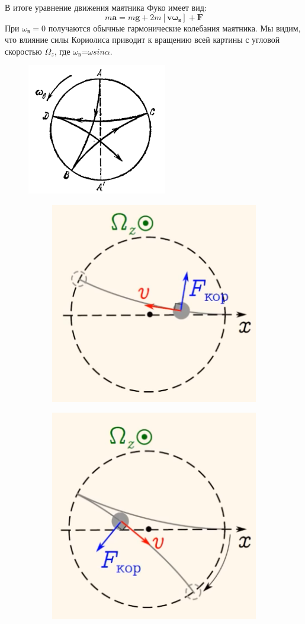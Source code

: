 \documentclass[a4, 12pt]{article}
\begin{document}
В итоге уравнение движения маятника Фуко имеет вид:
\begin{equation*}
    m\mathbf{a}=m\mathbf{g}+2m[\mathbf{v}\boldsymbol{\omega_\textbf{в}}]+\mathbf{F}
\end{equation*}
При $\omega_\textbf{в}=0$ получаются обычные гармонические колебания маятника. Мы видим, что влияние силы Кориолиса приводит к вращению всей картины с угловой скоростью $\Omega_z$, где $\omega_\textbf{в}$=$\omega sin\alpha$.\\
\begin{figure}[H]
    \centering
    \includegraphics[scale = 0.7]{traek1.png}
    \caption{}
\end{figure}
\newpage
\begin{figure}
\centering
\begin{subfigure}{\textwidth}
  \centering
  \includegraphics[width=.4\linewidth]{1f.png}
  \label{fig:sub1}
\end{subfigure}%
\begin{subfigure}{\textwidth}
  \centering
  \includegraphics[width=.4\linewidth]{2f.png}
  \label{fig:sub2}
\end{subfigure}
\label{fig:test}
\end{figure}
\end{document}
